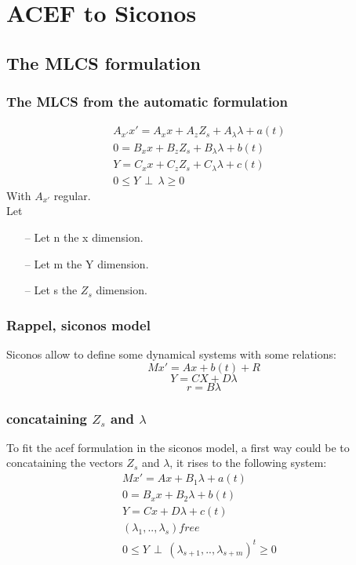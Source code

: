 
\newpage

\section{ACEF to Siconos}
\subsection{The MLCS formulation}
\subsubsection{The MLCS from the automatic formulation}
 \begin{eqnarray}
A_{x'}x'=A_{x}x +A_{z}Z_{s} +A_{\lambda} \lambda +a(t)&\label{eq2}\\
0=B_{x}x+B_{z}Z_{s} + B_{\lambda}\lambda + b(t)&\label{eq3}\\
Y=C_{x}x+C_{z}Z_{s}+C_{\lambda}\lambda + c(t) &\label{eq4}\\
0 \leq Y \, \perp \, \lambda \geq 0&\label{eqperp}
\end{eqnarray}
 With $A_{x'}$ regular.\\
 Let
 \begin{itemize}
  \item[--] Let n the x dimension.
  \item[--] Let m the Y dimension.
  \item[--] Let s the $Z_{s}$ dimension.
\end{itemize}

\subsubsection{Rappel, siconos model}
Siconos allow to define some dynamical systems with some relations:
\[Mx'=Ax +b(t)+R\]
\[Y=CX +D \lambda\]
\[r=B \lambda\]
\subsubsection{concataining $Z_{s}$ and $\lambda$ }
To fit the acef formulation in the siconos model, a first way could be to concataining the vectors $Z_{s}$ and $\lambda$, it rises to the following system:
 \begin{eqnarray}
Mx'=Ax +B_{1} \lambda +a(t)&\label{eq_merge_1}\\
0=B_{x}x+ B_{2}\lambda + b(t)&\label{eq_merge_2}\\
Y=Cx+D\lambda + c(t) &\label{eq_merge_3}\\
(\lambda_{1},..,\lambda_{s}) free\\
0 \leq Y \, \perp \, (\lambda_{s+1},..,\lambda_{s+m})^{t} \geq 0&\label{eq_merge_eqperp}
\end{eqnarray}


